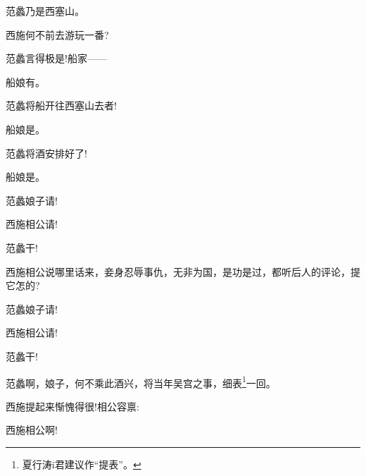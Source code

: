 {{范蠡\hspace{30pt}乃是西塞山。

西施\hspace{30pt}何不前去游玩一番?

范蠡\hspace{30pt}言得极是!船家------

船娘\hspace{30pt}有。

范蠡\hspace{30pt}将船开往西塞山去者!

船娘\hspace{30pt}是。

范蠡\hspace{30pt}将酒安排好了!

船娘\hspace{30pt}是。

范蠡\hspace{30pt}娘子请!

西施\hspace{30pt}相公请!

范蠡\hspace{30pt}干!


西施\hspace{30pt}相公说哪里话来，妾身忍辱事仇，无非为国，是功是过，都听后人的评论，提它怎的?

范蠡\hspace{30pt}娘子请!

西施\hspace{30pt}相公请!

范蠡\hspace{30pt}干!

范蠡\hspace{30pt}啊，娘子，何不乘此酒兴，将当年吴宫之事，细表\footnote{ 夏行涛i{\scriptsize 君}建议作``提表''。}一回。

西施\hspace{30pt}提起来惭愧得很!相公容禀: 


西施\hspace{30pt}相公啊!

}}
